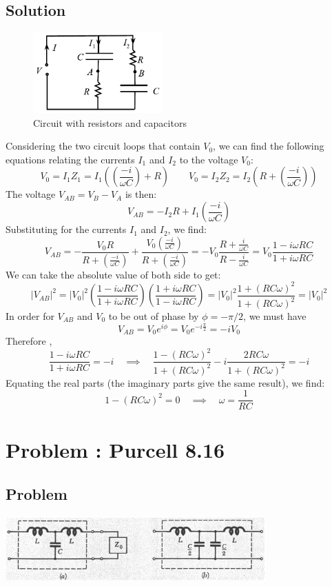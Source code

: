 \documentclass[solutions]{esg8022pset}
\begin{document}
\subsection{Solution}
  \begin{figure}[H]
    \centering
    \includegraphics[width = 5cm]{Purcell812}
    \caption{Circuit with resistors and capacitors}
    \label{RCRC}
  \end{figure}
  Considering the two circuit loops that contain $V_0$, we can find
  the following equations relating the currents $I_1$ and $I_2$ to the voltage
  $V_0$:
  $$ V_0 = I_1 Z_1 = I_1\left( (\frac{-i}{\omega C}) + R\right) \qquad V_0 = I_2 Z_2  = I_2\left(R + (\frac{-i}{\omega C})\right)$$
  The voltage $V_{AB} = V_B - V_A$ is then:
  $$V_{AB} = -I_2 R + I_1( \frac{-i}{\omega C})$$
  Substituting for the currents $I_1$ and $I_2$, we find:
  $$V_{AB} = -\frac{V_0 R}{R +( \frac{-i}{\omega C})} + \frac{V_0( \frac{-i}{\omega C})}{R + (\frac{-i}{\omega
  C})} = -V_0\frac{R + \frac{i}{\omega C}}{R - \frac{i}{\omega C}} =
  V_0\frac{1 - i \omega RC}{1 + i \omega RC}$$
  We can take the absolute value of both side to get:
  $$|V_{AB}|^2 = |V_0|^2\left(\frac{1-i\omega RC}{1+i\omega RC}\right)\left(\frac{1+i\omega RC}{1-i\omega
  RC}\right) = |V_0|^2\frac{1 + (RC\omega)^2}{1 + (RC\omega)^2} =
  |V_0|^2$$
  In order for $V_{AB}$ and $V_0$ to be out of phase by $\phi =
  -{\pi}/{2}$, we must have $$V_{AB} = V_0e^{i\phi} =
  V_0e^{-i\frac{\pi}{2}} = -iV_0$$ Therefore ,
  $$\frac{1 - i \omega RC}{1 + i \omega RC} = -i \quad \implies
  \quad \frac{1- (RC\omega)^2}{1+ (RC\omega)^2} -
  i\frac{2RC\omega}{1+ (RC\omega)^2} =-i$$
  Equating the real parts (the imaginary parts give the same result),
  we find:
  $$1-(RC\omega)^2 = 0  \quad \implies \quad \omega =
  \frac{1}{RC}$$

\section{Problem \thesection: Purcell 8.16}
\subsection{Problem}
  \begin{center}
    \includegraphics[width = 0.75\textwidth]{pu816}
  \end{center}
\end{document}
